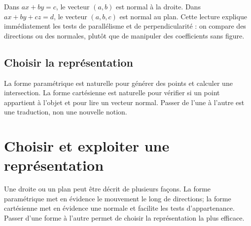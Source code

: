 \documentclass[12pt,a4paper,openany]{book}
\begin{document}
\begin{center}
\qquad
{}
\end{center}

\begin{connectionbox}
Dans $ax+by=c$, le vecteur $(a,b)$ est normal à la droite. Dans $ax+by+cz=d$, le vecteur $(a,b,c)$ est normal au plan. Cette lecture explique immédiatement les tests de parallélisme et de perpendicularité : on compare des directions ou des normales, plutôt que de manipuler des coefficients sans figure.
\end{connectionbox}

\subsection{Choisir la représentation}
La forme paramétrique est naturelle pour générer des points et calculer une intersection. La forme cartésienne est naturelle pour vérifier si un point appartient à l'objet et pour lire un vecteur normal. Passer de l'une à l'autre est une traduction, non une nouvelle notion.

\section{Choisir et exploiter une représentation}

Une droite ou un plan peut être décrit de plusieurs façons. La forme paramétrique met en évidence le mouvement le long de directions; la forme cartésienne met en évidence une normale et facilite les tests d'appartenance. Passer d'une forme à l'autre permet de choisir la représentation la plus efficace.
\end{document}
